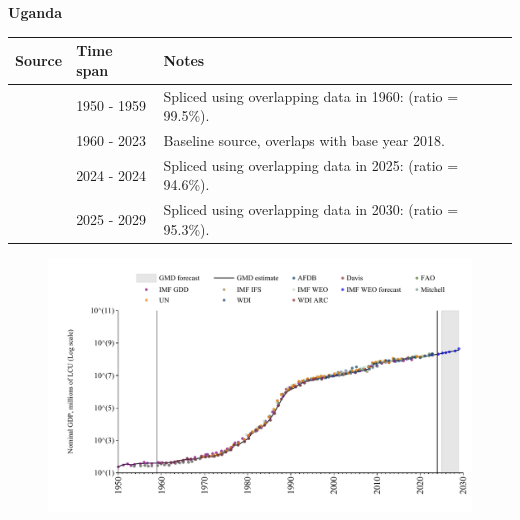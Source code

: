 \documentclass[12pt,a4paper,landscape]{article}
\begin{document}
\begin{adjustbox}{max totalsize={\paperwidth}{\paperheight},center}
\begin{minipage}[t][\textheight][t]{\textwidth}
\vspace*{0.5cm}
{}
\begin{center}
{\Large\bfseries Uganda}
\end{center}
\vspace{0.5cm}
\begin{table}[H]
\centering
\small
\begin{tabular}{|l|l|l|}
\hline
\textbf{Source} & \textbf{Time span} & \textbf{Notes} \\
\hline
\rowcolor{white}\cite{IMF_GDD}& 1950 - 1959 &Spliced using overlapping data in 1960: (ratio = 99.5\%).\\
\rowcolor{lightgray}\cite{WDI}& 1960 - 2023 &Baseline source, overlaps with base year 2018.\\
\rowcolor{white}\cite{IMF_IFS}& 2024 - 2024 &Spliced using overlapping data in 2025: (ratio = 94.6\%).\\
\rowcolor{lightgray}\cite{IMF_WEO_forecast}& 2025 - 2029 &Spliced using overlapping data in 2030: (ratio = 95.3\%).\\
\hline
\end{tabular}
\end{table}
\begin{figure}[H]
\centering
\includegraphics[width=\textwidth,height=0.6\textheight,keepaspectratio]{graphs/UGA_nGDP.pdf}
\end{figure}
\end{minipage}
\end{adjustbox}
\end{document}
